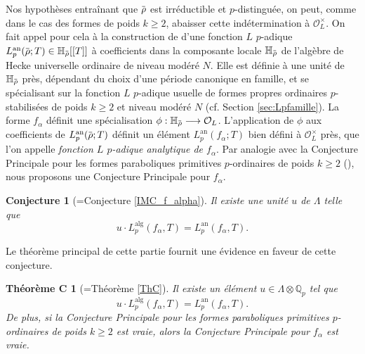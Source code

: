 \documentclass[12pt]{amsart}
\newcommand\bH{\mathbb{H}}
\newcommand\Qp{\mathbb{Q}_{p}}
\newcommand\cO{\mathcal{O}}
\newcommand{\ob}[1]{\mkern 1.5mu\overline{\mkern-1.5mu#1\mkern-1.5mu}\mkern 1.5mu}
\newcommand{\an}{\textrm{an}}
\newcommand{\alg}{\textrm{alg}}
\theoremstyle{defstyle}
\theoremstyle{thmstyle}
\newtheorem*{conjecture*}{Conjecture}
\newtheorem*{thC}{Théorème C}
\begin{document}
Nos hypothèses entraînant que $\ob{\rho}$ est irréductible et $p$-distinguée, on peut, comme dans le cas des formes de poids $k\geq 2$, abaisser cette indétermination à $\cO_L^\times$. On fait appel pour cela à la construction de \cite{emerton2006variation} d'une fonction $L$ $p$-adique $L_p^{\an}(\ob{\rho};T)\in\bH_{\ob{\rho}}[[T]]$ à coefficients dans la composante locale $\bH_{\ob{\rho}}$ de l'algèbre de Hecke universelle ordinaire de niveau modéré $N$. Elle est définie à une unité de $\bH_{\ob{\rho}}$ près, dépendant du choix d'une période canonique en famille, et se spécialisant sur la fonction $L$ $p$-adique usuelle de formes propres ordinaires $p$-stabilisées de poids $k\geq 2$ et niveau modéré $N$ (cf. Section \ref{sec:Lpfamille}). La forme $f_\alpha$ définit une spécialisation $\phi : \bH_{\ob{\rho}} \longrightarrow \cO_L$. L'application de $\phi$ aux coefficients de $L_p^{\an}(\ob{\rho};T)$ définit un élément $L_p^{\an}(f_\alpha;T)$ bien défini à $\cO_L^\times$ près, que l'on appelle\textit{ fonction $L$ $p$-adique analytique de $f_\alpha$}. Par analogie avec la Conjecture Principale pour les formes paraboliques primitives $p$-ordinaires de poids $k\geq 2$ (\cite[Conjecture 3.24]{skinner2014iwasawa}), nous proposons une Conjecture Principale pour $f_\alpha$.

\begin{conjecture*}[=Conjecture \ref{IMC_f_alpha}]
	Il existe une unité $u$ de $\Lambda$ telle que 
	$$ u \cdot L_p^{\alg}(f_\alpha,T)=L_p^{\an}(f_\alpha,T).$$
\end{conjecture*}

Le théorème principal de cette partie fournit une évidence en faveur de cette conjecture.

\begin{thC}[=Théorème \ref{ThC}] Il existe un élément $u\in\Lambda \otimes \Qp$ tel que
	$$ u \cdot L_p^{\alg}(f_\alpha,T)=L_p^{\an}(f_\alpha,T).$$
	De plus, si la Conjecture Principale pour les formes paraboliques primitives $p$-ordinaires de poids $k\geq 2$ est vraie, alors la Conjecture Principale pour $f_\alpha$ est vraie.
\end{thC}
\end{document}
